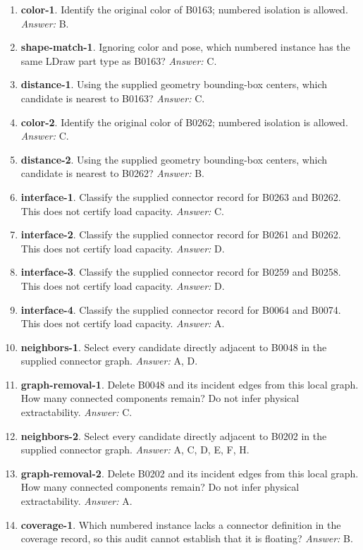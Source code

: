 \begin{enumerate}
\item \textbf{color-1}. Identify the original color of B0163; numbered isolation is allowed. \textit{Answer:} B.
\item \textbf{shape-match-1}. Ignoring color and pose, which numbered instance has the same LDraw part type as B0163? \textit{Answer:} C.
\item \textbf{distance-1}. Using the supplied geometry bounding-box centers, which candidate is nearest to B0163? \textit{Answer:} C.
\item \textbf{color-2}. Identify the original color of B0262; numbered isolation is allowed. \textit{Answer:} C.
\item \textbf{distance-2}. Using the supplied geometry bounding-box centers, which candidate is nearest to B0262? \textit{Answer:} B.
\item \textbf{interface-1}. Classify the supplied connector record for B0263 and B0262. This does not certify load capacity. \textit{Answer:} C.
\item \textbf{interface-2}. Classify the supplied connector record for B0261 and B0262. This does not certify load capacity. \textit{Answer:} D.
\item \textbf{interface-3}. Classify the supplied connector record for B0259 and B0258. This does not certify load capacity. \textit{Answer:} D.
\item \textbf{interface-4}. Classify the supplied connector record for B0064 and B0074. This does not certify load capacity. \textit{Answer:} A.
\item \textbf{neighbors-1}. Select every candidate directly adjacent to B0048 in the supplied connector graph. \textit{Answer:} A, D.
\item \textbf{graph-removal-1}. Delete B0048 and its incident edges from this local graph. How many connected components remain? Do not infer physical extractability. \textit{Answer:} C.
\item \textbf{neighbors-2}. Select every candidate directly adjacent to B0202 in the supplied connector graph. \textit{Answer:} A, C, D, E, F, H.
\item \textbf{graph-removal-2}. Delete B0202 and its incident edges from this local graph. How many connected components remain? Do not infer physical extractability. \textit{Answer:} A.
\item \textbf{coverage-1}. Which numbered instance lacks a connector definition in the coverage record, so this audit cannot establish that it is floating? \textit{Answer:} B.

\end{enumerate}
